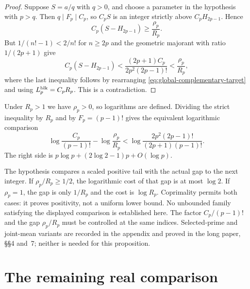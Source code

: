 \documentclass[11pt]{article}
\begin{document}
\begin{proof}
Suppose $S=a/q$ with $q>0$, and choose a parameter in the hypothesis
with $p>q$. Then $q\mid F_p\mid C_p$, so $C_pS$ is an integer strictly
above $C_pH_{2p-1}$. Hence
\[
 C_p(S-H_{2p-1})\ge\frac{\rho_p}{R_p}.
\]
But $1/(n!-1)<2/n!$ for $n\ge2p$ and the geometric majorant with ratio
$1/(2p+1)$ give
\[
 C_p(S-H_{2p-1})
 <\frac{(2p+1)C_p}{2p^2(2p-1)!}
 <\frac{\rho_p}{R_p},
\]
where the last inequality follows by rearranging
\eqref{eq:global-complementary-target} and using $L_p^{\rm blk}=C_pR_p$.
This is a contradiction.
\end{proof}

Under $R_p>1$ we have $\rho_p>0$, so logarithms are defined.
Dividing the strict inequality by $R_p$ and by $F_p=(p-1)!$ gives the
equivalent logarithmic comparison
\begin{equation}
\log\frac{C_p}{(p-1)!}-\log\frac{\rho_p}{R_p}
<\log\frac{2p^2(2p-1)!}{(2p+1)(p-1)!}.
\label{eq:joint-loss-budget}
\end{equation}
The right side is $p\log p+(2\log2-1)p+O(\log p)$.

The hypothesis compares a scaled positive tail with the actual gap to the
next integer. If $\rho_p/R_p\ge1/2$, the logarithmic cost of that gap is at
most $\log2$. If $\rho_p=1$, the gap is only $1/R_p$ and the cost is
$\log R_p$. Coprimality permits both cases: it proves positivity, not a
uniform lower bound. No unbounded family satisfying the displayed
comparison is established here.
The factor $C_p/(p-1)!$ and the gap $\rho_p/R_p$ must be controlled at
the same indices. Selected-prime and joint-mean variants are recorded
in the appendix and proved in the long paper, \S\S4 and~7; neither is
needed for this proposition.

\section{The remaining real comparison}\label{sec:open}\label{sec:plateau}
\end{document}
